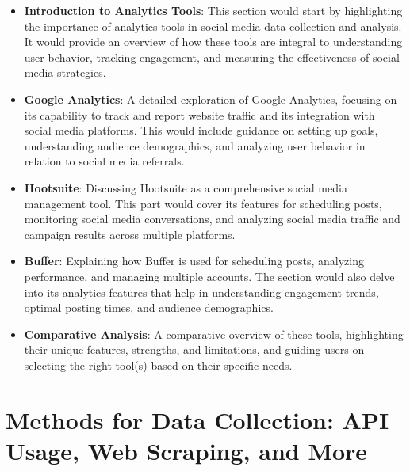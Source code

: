 \documentclass[
]{book}
\providecommand{\tightlist}{%
  \setlength{\itemsep}{0pt}\setlength{\parskip}{0pt}}
\begin{document}
\begin{itemize}
\tightlist
\item
  \textbf{Introduction to Analytics Tools}: This section would start by highlighting the importance of analytics tools in social media data collection and analysis. It would provide an overview of how these tools are integral to understanding user behavior, tracking engagement, and measuring the effectiveness of social media strategies.
\item
  \textbf{Google Analytics}: A detailed exploration of Google Analytics, focusing on its capability to track and report website traffic and its integration with social media platforms. This would include guidance on setting up goals, understanding audience demographics, and analyzing user behavior in relation to social media referrals.
\item
  \textbf{Hootsuite}: Discussing Hootsuite as a comprehensive social media management tool. This part would cover its features for scheduling posts, monitoring social media conversations, and analyzing social media traffic and campaign results across multiple platforms.
\item
  \textbf{Buffer}: Explaining how Buffer is used for scheduling posts, analyzing performance, and managing multiple accounts. The section would also delve into its analytics features that help in understanding engagement trends, optimal posting times, and audience demographics.
\item
  \textbf{Comparative Analysis}: A comparative overview of these tools, highlighting their unique features, strengths, and limitations, and guiding users on selecting the right tool(s) based on their specific needs.
\end{itemize}

\hypertarget{methods-for-data-collection-api-usage-web-scraping-and-more}{%
\section*{Methods for Data Collection: API Usage, Web Scraping, and More}\label{methods-for-data-collection-api-usage-web-scraping-and-more}}
\end{document}
